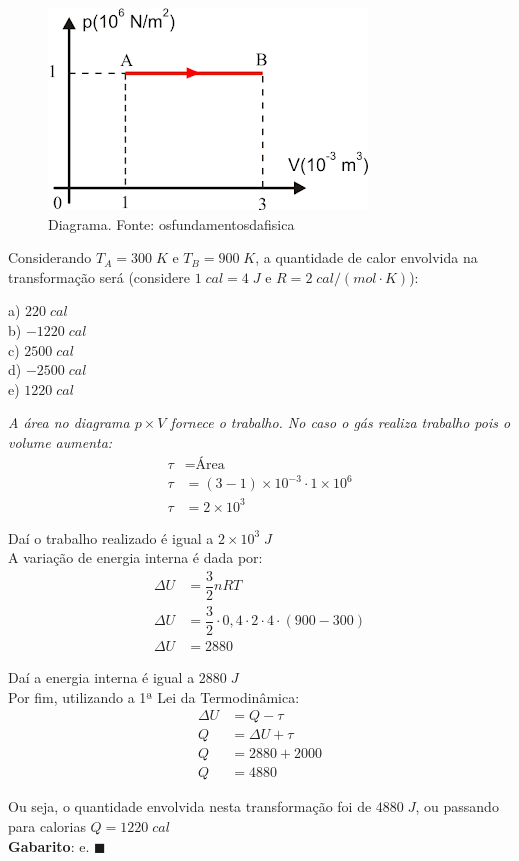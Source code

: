 \documentclass[12pt]{article}
\newenvironment{resposta*}
{\bf Resposta:\\ }
{}
\begin{document}
\begin{figure}[h]{}
\centering\includegraphics[width=2.5truein]{img12.png}
\caption{Diagrama. Fonte: osfundamentosdafisica}
\centering
\end{figure}

Considerando $T_{A}=300\;K$ e $T_{B}=900\;K$, a quantidade de calor envolvida na transformação será (considere $1\;cal = 4\;J$ e $R = 2\;cal/(mol\cdot K)$):


a) $220\;cal$ \\
b) $-1220\;cal$ \\
c) $2500\;cal$ \\
d) $-2500\;cal$ \\
e) $1220\;cal$


\begin{resposta*}
{\it A área no diagrama $p\times V$ fornece o trabalho. No caso o gás realiza trabalho pois o volume aumenta:
\begin{align*}
    \tau &= \text{Área} \\
    \tau &= (3-1)\times 10^{-3}\cdot 1\times 10^{6} \\
    \tau &= 2\times 10^{3}
\end{align*}

Daí o trabalho realizado é igual a $2\times 10^{3}\;J$ \\

A variação de energia interna é dada por:
\begin{align*}
    \Delta U &= \dfrac{3}{2}nRT \\
    \Delta U &= \dfrac{3}{2}\cdot 0,4\cdot 2\cdot 4\cdot (900-300) \\
    \Delta U &= 2880
\end{align*}

Daí a energia interna é igual a $2880\;J$ \\

Por fim, utilizando a 1ª Lei da Termodinâmica:
\begin{align*}
    \Delta U &= Q - \tau \\
    Q &= \Delta U + \tau \\
    Q &= 2880 + 2000 \\
    Q &= 4880
\end{align*}

Ou seja, o quantidade envolvida nesta transformação foi de $4880\;J$, ou passando para calorias $\boxed{Q=1220\;cal}$ \\
\textbf{Gabarito}: e. $\blacksquare$}
\end{resposta*}
\end{document}
